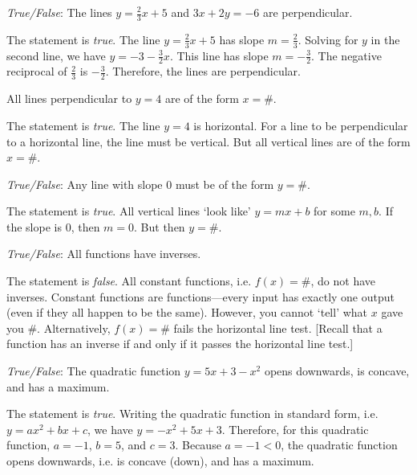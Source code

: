 \documentclass[11pt,letterpaper]{article}
\begin{document}
\quizsol \textit{True/False}: The lines $y= \frac{2}{3}x + 5$ and $3x + 2y= -6$ are perpendicular. \pspace

\sol The statement is \textit{true}. The line $y= \frac{2}{3}x + 5$ has slope $m= \frac{2}{3}$. Solving for $y$ in the second line, we have $y= -3 - \frac{3}{2} x$. This line has slope $m= -\frac{3}{2}$. The negative reciprocal of $\frac{2}{3}$ is $-\frac{3}{2}$. Therefore, the lines are perpendicular. \pvspace{1.5cm}



\quizsol All lines perpendicular to $y= 4$ are of the form $x= \#$. \pspace

\sol The statement is \textit{true}. The line $y= 4$ is horizontal. For a line to be perpendicular to a horizontal line, the line must be vertical. But all vertical lines are of the form $x= \#$. 



\newpage



\quizsol \textit{True/False}: Any line with slope 0 must be of the form $y= \#$. \pspace

\sol The statement is \textit{true}. All vertical lines `look like' $y= mx + b$ for some $m, b$. If the slope is 0, then $m= 0$. But then $y= \#$. \pvspace{1.5cm}



\quizsol \textit{True/False}: All functions have inverses. \pspace

\sol The statement is \textit{false}. All constant functions, i.e. $f(x)= \#$, do not have inverses. Constant functions are functions---every input has exactly one output (even if they all happen to be the same). However, you cannot `tell' what $x$ gave you \#. Alternatively, $f(x)= \#$ fails the horizontal line test. [Recall that a function has an inverse if and only if it passes the horizontal line test.] \pvspace{1.5cm}



\quizsol \textit{True/False}: The quadratic function $y= 5x + 3 - x^2$ opens downwards, is concave, and has a maximum. \pspace

\sol The statement is \textit{true}. Writing the quadratic function in standard form, i.e. $y= ax^2 + bx + c$, we have $y= -x^2 + 5x + 3$. Therefore, for this quadratic function, $a= -1$, $b= 5$, and $c= 3$. Because $a= -1 < 0$, the quadratic function opens downwards, i.e. is concave (down), and has a maximum. \pvspace{1.5cm} 
\end{document}
